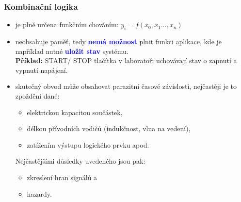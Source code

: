 	\begin{frame}
    \frametitle{Kombinační logika}
		\boldmath
		
		\begin{itemize}
			\item je plně určena funkčním chováním: $y_i = f(x_0, x_1 ..., x_n)$
			\item neobsahuje paměť, tedy \textbf{\textcolor{blue}{nemá možnost}} plnit funkci aplikace, kde je například nutné \textbf{\textcolor{blue}{uložit stav}} systému. \\ \vspace{3pt}
			\textbf{Příklad:} START/ STOP tlačítka v laboratoři uchovávají stav o zapnutí a vypnutí napájení.
			\item skutečný obvod může obsahovat parazitní časové závislosti, nejčastěji je to zpoždění dané:
			
			\begin{itemize}
				\item elektrickou kapacitou součástek,
				\item délkou přívodních vodičů (indukčnost, vlna na vedení),
				\item zatížením výstupu logického prvku apod.
			\end{itemize}
			
			Nejčastějšími důsledky uvedeného jsou pak:
			
			\begin{itemize}
				\item zkreslení hran signálů a
				\item hazardy.
			\end{itemize}
		\end{itemize}
		
	\end{frame}
	
